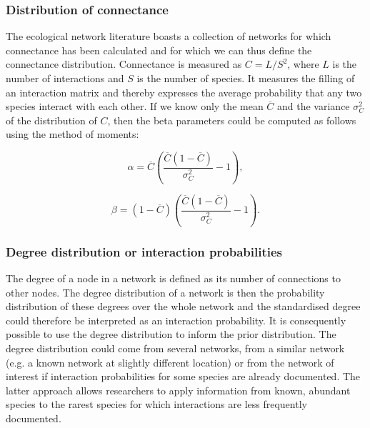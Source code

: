 \documentclass[12pt]{article}
\begin{document}
\begin{spacing}{2.0}
      \subsubsection*{Distribution of connectance}
        
          The ecological network literature boasts a collection of networks for which connectance has been calculated and for which we can thus define the connectance distribution. Connectance is measured as $C = L/S^2$, where $L$ is the number of interactions and $S$ is the number of species. It measures the filling of an interaction matrix and thereby expresses the average probability that any two species interact with each other. If we know only the mean $\overline{C}$ and the variance $\sigma_C^2$ of the distribution of $C$,          then the beta parameters could be computed as follows using the method of moments:

          \begin{equation}
          \alpha = \overline{C}(\frac{\overline{C}(1-\overline{C})}{\sigma_C^2}-1) ,
          \end{equation}

          \begin{equation}
          \beta = (1-\overline{C})(\frac{\overline{C}(1-\overline{C})}{\sigma_C^2}-1) .
          \end{equation}
    

      \subsubsection*{Degree distribution or interaction probabilities}

          The degree of a node in a network is defined as its number of connections to other nodes. The degree distribution of a network is then the probability distribution of these degrees over the whole network and the standardised degree could therefore be interpreted as an interaction probability. It is consequently possible to use the degree distribution to inform the prior distribution. The degree distribution could come from several networks, from a similar network (e.g. a known network at slightly different location) or from the network of interest if interaction probabilities for some species are already documented. The latter approach allows researchers to apply information from known, abundant species to the rarest species for which interactions are less frequently documented. 



\end{spacing}
\end{document}
